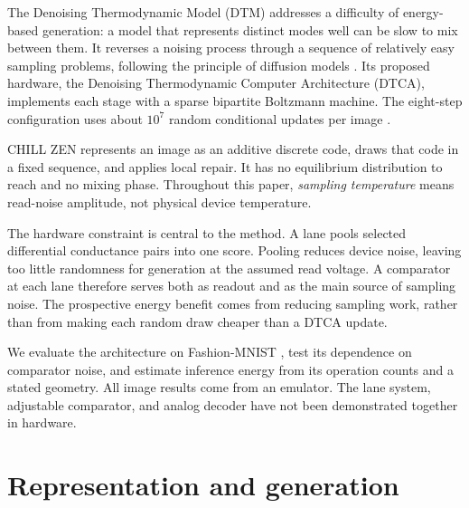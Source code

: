 \documentclass[reprint,amsmath,amssymb,aps,pra,floatfix,nofootinbib]{revtex4-2}
\begin{document}
The Denoising Thermodynamic Model (DTM) addresses a difficulty of energy-based generation: a model that represents distinct modes well can be slow to mix between them. It reverses a noising process through a sequence of relatively easy sampling problems, following the principle of diffusion models \cite{sohldickstein2015deep,ho2020ddpm}. Its proposed hardware, the Denoising Thermodynamic Computer Architecture (DTCA), implements each stage with a sparse bipartite Boltzmann machine. The eight-step configuration uses about $10^7$ random conditional updates per image \cite{jelincic2025dtm}.

CHILL ZEN represents an image as an additive discrete code, draws that code in a fixed sequence, and applies local repair. It has no equilibrium distribution to reach and no mixing phase. Throughout this paper, \emph{sampling temperature} means read-noise amplitude, not physical device temperature.

The hardware constraint is central to the method. A lane pools selected differential conductance pairs into one score. Pooling reduces device noise, leaving too little randomness for generation at the assumed read voltage. A comparator at each lane therefore serves both as readout and as the main source of sampling noise. The prospective energy benefit comes from reducing sampling work, rather than from making each random draw cheaper than a DTCA update.

We evaluate the architecture on Fashion-MNIST \cite{xiao2017fashion}, test its dependence on comparator noise, and estimate inference energy from its operation counts and a stated geometry. All image results come from an emulator. The lane system, adjustable comparator, and analog decoder have not been demonstrated together in hardware.

\section{Representation and generation}\label{sec:method}
\end{document}
